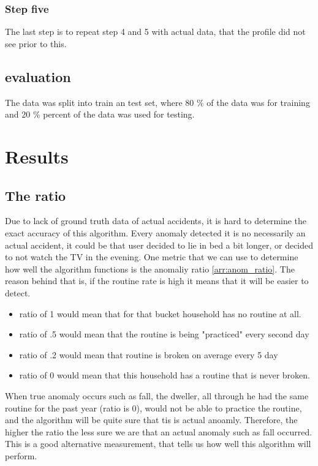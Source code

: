 \subsubsection{Step five}

The last step is to repeat step 4 and 5 with actual data, that the profile did not see prior to this. 

\subsection{evaluation}

The data was split into train an test set, where 80 \% of the data was for training and 20 \% percent of the data was used for testing.


\section{Results}

\subsection{The ratio}

Due to lack of ground truth data of actual accidents, it is hard to determine the 
exact accuracy of this algorithm. Every anomaly detected it is no necessarily an 
actual accident, it could be that user decided to lie in bed a bit longer, or decided to not watch 
the TV in the evening.
One metric that we can use to determine how well the algorithm functions is the anomaliy ratio \ref{arr:anom_ratio}.
The reason behind that is, if the routine rate is high it means that it will be easier to detect.

\begin{itemize}
	\item ratio of 1 would mean that for that bucket household has no routine at all.
    \item ratio of .5 would mean that the routine is being "practiced" every second day
    \item ratio of .2 would mean that routine is broken on average every 5 day
    \item ratio of 0 would mean that this household has a routine that is never broken. 
\end{itemize}

When true anomaly occurs such as fall, the dweller, all through he had the same routine for the past year (ratio is 0), would not be able to practice the routine, and the algorithm will be quite sure that tis is actual anoamly.
Therefore, the higher the ratio the less sure we are that an actual anomaly such as fall occurred.
This is a good alternative measurement, that tells us how well this algorithm will perform. 

